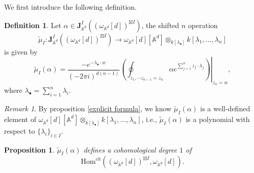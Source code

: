 \documentclass[11pt]{amsart}
\newtheorem{prop}[thm]{Proposition}
\theoremstyle{definition}
\newtheorem{defn}[thm]{Definition}
\theoremstyle{remark}
\newtheorem{rem}[thm]{Remark}
\numberwithin{equation}{section}
\begin{document}
We first introduce the following definition.
\begin{defn}
    Let $\alpha\in \mathbf{J}^{ I}_{\mathbb{A}^{d}}((\omega_{\mathbb{A}^{d}}[d])^{\boxtimes I})$, the shifted $n$ operation
    $$
    \tilde{\mu}_{ I}:\mathbf{J}^{ I}_{\mathbb{A}^{d}}((\omega_{\mathbb{A}^{d}}[d])^{\boxtimes I})\rightarrow \omega_{\mathbb{A}^{d}}[d][\mathbb{A}^{d}]\otimes_{k[\lambda_{\bullet}]}k[\lambda_{1},\dots,\lambda_{n}]
    $$
    is given by
    $$
    \tilde{\mu}_{ I}(\alpha)=\frac{-e^{-\lambda_{\bullet}\cdot w}}{(-2\pi i)^{d(n-1)}}\left.\left(\oint_{z_{1},\cdots z_{n-1}=z_{n}}\alpha e^{\sum_{j=1}^{n}z_{j}\cdot \lambda_{j}}\right)\right|_{z_n=w},
    $$
    where $\lambda_{\bullet}=\sum_{i=1}^{n}\lambda_{i}$.
\end{defn}
\begin{rem}
    By proposition \ref{explicit formula}, we know $\tilde{\mu}_{ I}(\alpha)$ is a well-defined element of $\omega_{\mathbb{A}^{d}}[d][\mathbb{A}^{d}]\otimes_{k[\lambda_{\bullet}]}k[\lambda_{1},\dots,\lambda_{n}]$, i.e., $\tilde{\mu}_{ I}(\alpha)$ is a polynomial with respect to $\{\lambda_{i}\}_{i\in I}$.
\end{rem}
\begin{prop}
    $\tilde{\mu}_{ I}(\alpha)$ defines a cohomological degree $1$ of
    \[
      \mathrm{Hom}^{ch}((\omega_{\mathbb{A}^{d}}[d])^{\boxtimes I},\omega_{\mathbb{A}^{d}}[d]) .
    \]
\end{prop}
\end{document}
